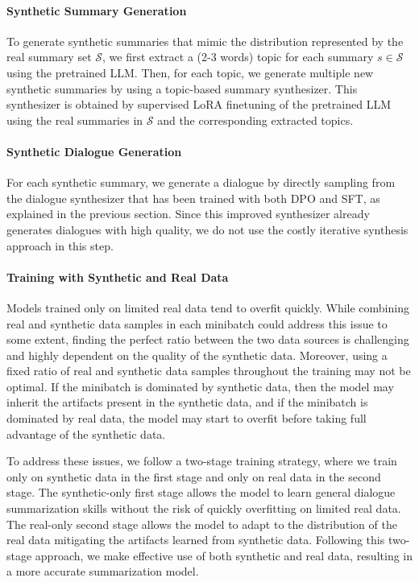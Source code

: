 \paragraph{Synthetic Summary Generation}
To generate synthetic summaries that mimic the distribution represented by the real summary set $\mathcal{S}$, we first extract a (2-3 words) topic for each summary $s \in \mathcal{S}$ using the pretrained LLM. 
Then, for each topic, we generate multiple new synthetic summaries by using a topic-based summary synthesizer. 
This synthesizer is obtained by supervised LoRA finetuning of the pretrained LLM using the real summaries in $\mathcal{S}$ and the corresponding extracted topics. %

\paragraph{Synthetic Dialogue Generation}
For each synthetic summary, we generate a dialogue by directly sampling from the dialogue synthesizer that has been trained with both DPO and SFT, as explained in the previous section. 
Since this improved synthesizer already generates dialogues with high quality, we do not use the costly iterative synthesis approach in this step.

\paragraph{Training with Synthetic and Real Data}
Models trained only on limited real data tend to overfit quickly. While combining real and synthetic data samples in each minibatch could address this issue to some extent, finding the perfect ratio between the two data sources is challenging and highly dependent on the quality of the synthetic data. Moreover, using a fixed ratio of real and synthetic data samples throughout the training may not be optimal. If the minibatch is dominated by synthetic data, then the model may inherit the artifacts present in the synthetic data, and if the minibatch is dominated by real data, the model may start to overfit before taking full advantage of the synthetic data. 

To address these issues, we follow a two-stage training strategy, where we train only on synthetic data in the first stage and only on real data in the second stage. The synthetic-only first stage allows the model to learn general dialogue summarization skills without the risk of quickly overfitting on limited real data. The real-only second stage allows the model to adapt to the distribution of the real data mitigating the artifacts learned from synthetic data. Following this two-stage approach, we make effective use of both synthetic and real data, resulting in a more accurate summarization model.

